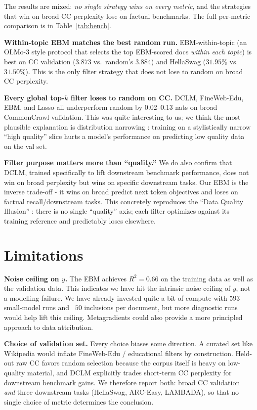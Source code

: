 \documentclass[twocolumn,letterpaper,10pt]{article}
\begin{document}
The results are mixed: \emph{no single strategy wins on every metric},
and the strategies that win on broad CC perplexity lose on factual
benchmarks. The full per-metric comparison is in
Table~\ref{tab:bench}.

\textbf{Within-topic EBM matches the best random run.} EBM-within-topic
(an OLMo-3 style protocol \citep{olmo3} that selects the top
EBM-scored docs \emph{within each topic}) is best on CC validation
($3.873$ vs.\ random's $3.884$) and HellaSwag ($31.95\%$ vs.\
$31.50\%$). This is the only filter strategy that does not lose to
random on broad CC perplexity.

\textbf{Every global top-$k$ filter loses to random on CC.}
DCLM, FineWeb-Edu, EBM, and Lasso all underperform random by
$0.02$--$0.13$ nats on broad CommonCrawl validation. This was quite interesting to us; we think the most
plausible explanation is distribution narrowing
\citep{naitsaada2025illusion}: training on a stylistically narrow ``high quality''
slice hurts a model's performance on predicting low quality data on the val set.

\textbf{Filter purpose matters more than ``quality.''} We do also confirm that DCLM,
trained specifically to lift downstream benchmark performance, does not win on broad perplexity but wins on specific downstream tasks. Our EBM is the inverse
trade-off - it wins on broad predict next token objectives and loses on factual recall/downstream tasks. This concretely reproduces the ``Data Quality Illusion''
\citep{naitsaada2025illusion}: there is no single ``quality'' axis;
each filter optimizes against its training reference and predictably
loses elsewhere.

\section{Limitations}
\label{sec:limitations}

\textbf{Noise ceiling on $y$.} The EBM achieves $R^2 = 0.66$ on the
training data as well as the validation data. This indicates we have
hit the intrinsic noise ceiling of $y$, not a modelling failure. We have already invested quite a bit of compute with $593$ small-model runs and ~$50$ inclusions per document, but more diagnostic runs would help lift this ceiling. Metagradients could also provide a more principled approach to data attribution.

\textbf{Choice of validation set.} Every choice biases some direction.
A curated set like Wikipedia would inflate FineWeb-Edu / educational
filters by construction. Held-out raw CC favors random selection
because the corpus itself is heavy on low-quality material, and DCLM
explicitly trades short-term CC perplexity for downstream benchmark
gains. We therefore report both: broad CC validation \emph{and} three
downstream tasks (HellaSwag, ARC-Easy, LAMBADA), so that no single
choice of metric determines the conclusion.
\end{document}
